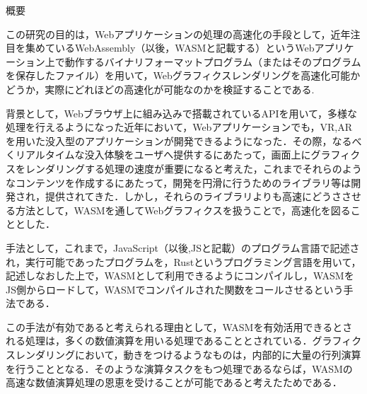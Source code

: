 

\begin{center}
		{\gtfamily \Large 概要}
\end{center}
\vspace{1cm}
\thispagestyle{empty}	



 この研究の目的は，Webアプリケーションの処理の高速化の手段として，近年注目を集めているWebAssembly（以後，WASMと記載する）というWebアプリケーション上で動作するバイナリフォーマットプログラム（またはそのプログラムを保存したファイル）を用いて，Webグラフィクスレンダリングを高速化可能かどうか，実際にどれほどの高速化が可能なのかを検証することである.
 
 背景として，Webブラウザ上に組み込みで搭載されているAPIを用いて，多様な処理を行えるようになった近年において，Webアプリケーションでも，VR,ARを用いた没入型のアプリケーションが開発できるようになった．その際，なるべくリアルタイムな没入体験をユーザへ提供するにあたって，画面上にグラフィクスをレンダリングする処理の速度が重要になると考えた，これまでそれらのようなコンテンツを作成するにあたって，開発を円滑に行うためのライブラリ等は開発され，提供されてきた．しかし，それらのライブラリよりも高速にどうささせる方法として，WASMを通してWebグラフィクスを扱うことで，高速化を図ることとした．
 
 手法として，これまで，JavaScript（以後,JSと記載）のプログラム言語で記述され，実行可能であったプログラムを，Rustというプログラミング言語を用いて，記述しなおした上で，WASMとして利用できるようにコンパイルし，WASMをJS側からロードして，WASMでコンパイルされた関数をコールさせるという手法である．
 
 この手法が有効であると考えられる理由として，WASMを有効活用できるとされる処理は，多くの数値演算を用いる処理であることとされている．グラフィクスレンダリングにおいて，動きをつけるようなものは，内部的に大量の行列演算を行うこととなる．そのような演算タスクをもつ処理であるならば，WASMの高速な数値演算処理の恩恵を受けることが可能であると考えたためである．
 
